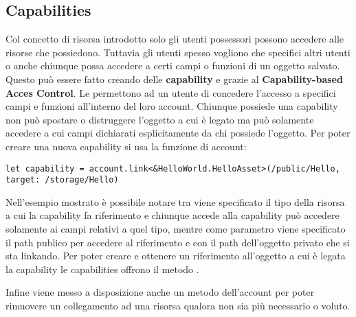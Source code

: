 \subsection{Capabilities}
Col concetto di risorsa introdotto solo gli utenti possessori possono accedere alle risorse che possiedono. Tuttavia gli utenti spesso vogliono che specifici altri utenti o anche chiunque possa accedere a certi campi o funzioni di un oggetto salvato. Questo può essere fatto creando delle \textbf{capability} e grazie al \textbf{Capability-based Acces Control}. Le  permettono ad un utente di concedere l'accesso a specifici campi e funzioni all'interno del loro account. Chiunque possiede una capability non può spostare o distruggere l'oggetto a cui è legato ma può solamente accedere a cui campi dichiarati esplicitamente da chi possiede l'oggetto. Per poter creare una nuova capability si usa la funzione  di account:
\begin{lstlisting}[style=all, style=cadence]
let capability = account.link<&HelloWorld.HelloAsset>(/public/Hello,    target: /storage/Hello)
\end{lstlisting}
Nell'esempio mostrato è possibile notare tra \codeinline{<>} viene specificato il tipo della risorsa a cui la capability fa riferimento e chiunque accede alla capability può accedere solamente ai campi relativi a quel tipo, mentre come parametro viene specificato il path publico per accedere al riferimento e con  il path dell'oggetto privato che si sta linkando.
Per poter creare e ottenere un riferimento all'oggetto a cui è legata la capability le capabilities offrono il metodo . 

Infine viene messo a disposizione anche un metodo  dell'account per poter rimuovere un collegamento ad una risorsa qualora non sia più necessario o voluto.